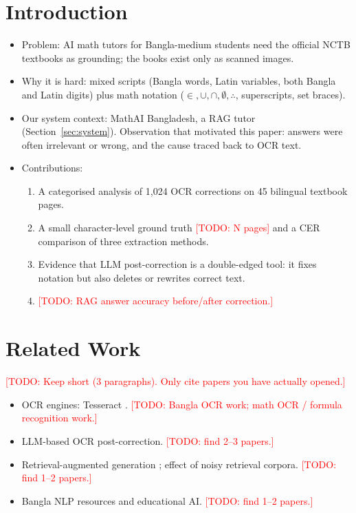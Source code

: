 \documentclass[11pt]{article}
\newcommand{\todo}[1]{\textcolor{red}{[TODO: #1]}}
\begin{document}
\section{Introduction}
\begin{itemize}
  \item Problem: AI math tutors for Bangla-medium students need the official
        NCTB textbooks as grounding; the books exist only as scanned images.
  \item Why it is hard: mixed scripts (Bangla words, Latin variables, both
        Bangla and Latin digits) plus math notation ($\in, \cup, \cap,
        \emptyset, \therefore$, superscripts, set braces).
  \item Our system context: MathAI Bangladesh, a RAG tutor (Section~\ref{sec:system}).
        Observation that motivated this paper: answers were often irrelevant
        or wrong, and the cause traced back to OCR text.
  \item Contributions:
    \begin{enumerate}
      \item A categorised analysis of 1{,}024 OCR corrections on 45 bilingual
            textbook pages.
      \item A small character-level ground truth \todo{N pages} and a CER
            comparison of three extraction methods.
      \item Evidence that LLM post-correction is a double-edged tool: it fixes
            notation but also deletes or rewrites correct text.
      \item \todo{RAG answer accuracy before/after correction.}
    \end{enumerate}
\end{itemize}

\section{Related Work}
\todo{Keep short (3 paragraphs). Only cite papers you have actually opened.}
\begin{itemize}
  \item OCR engines: Tesseract \cite{smith2007tesseract}. \todo{Bangla OCR
        work; math OCR / formula recognition work.}
  \item LLM-based OCR post-correction. \todo{find 2--3 papers.}
  \item Retrieval-augmented generation \cite{lewis2020rag}; effect of noisy
        retrieval corpora. \todo{find 1--2 papers.}
  \item Bangla NLP resources and educational AI. \todo{find 1--2 papers.}
\end{itemize}
\end{document}
